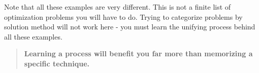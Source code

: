 \documentclass{ximera}
\begin{document}
%
%
%
%

Note that all these examples are very different. This is not a finite list of optimization problems you will have to do. Trying to categorize problems by solution method will not work here - you must learn the unifying process behind all these examples.
\begin{quote}
  \textbf{Learning a process will benefit you far more than memorizing
    a specific technique.}
\end{quote}
\end{document}
